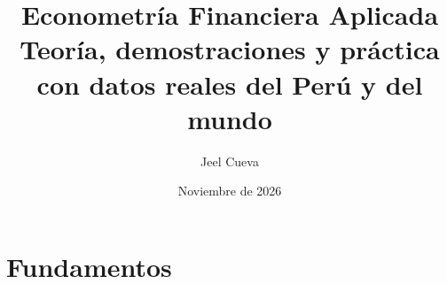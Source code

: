 \documentclass[11pt,a4paper,oneside]{book}
\title{\textbf{Econometría Financiera Aplicada}\\[6pt]
\large Teoría, demostraciones y práctica con datos reales del Perú y del mundo}
\author{Jeel Cueva}
\date{Noviembre de 2026}
\begin{document}
\frontmatter


\tableofcontents

\mainmatter
\part{Fundamentos}






















\end{document}
